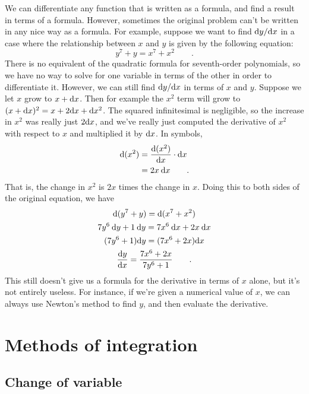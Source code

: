 We can differentiate any function that is written as a formula,
and find a result in terms of a formula. However, sometimes the
original problem can't be written in any nice way as a formula.
For example, suppose we want to find $\textup{d} y/\textup{d} x$ in a case
where the relationship between $x$
and $y$ is given by the following equation:
\begin{equation*}
  y^7+y = x^7+x^2 \qquad .
\end{equation*}
There is no equivalent of the quadratic formula for seventh-order
polynomials, so we have no way to solve for one variable in terms
of the other in order to differentiate it. However, we can still
find $\textup{d} y/\textup{d} x$ in terms of $x$ and $y$. Suppose we let $x$
grow to $x+\textup{d} x$. Then for example the $x^2$ term will grow
to $(x+\textup{d} x)^2=x+2\textup{d} x+\textup{d} x^2$. The squared infinitesimal
is negligible, so the increase in $x^2$ was really just
$2\textup{d} x$, and we've really just computed the derivative of
$x^2$ with respect to $x$ and multiplied it by $\textup{d} x$. In
symbols,
\begin{align*}
  \textup{d}(x^2) &= \frac{\textup{d}(x^2)}{\textup{d} x} \cdot \textup{d} x \\
           &= 2x \: \textup{d} x \qquad .
\end{align*}
That is, the change in $x^2$ is $2x$ times the change in $x$.
Doing this to both sides of the original equation, we have
\begin{gather*}
  \textup{d}(y^7+y) = \textup{d}(x^7+x^2)\\
  7y^6\:\textup{d} y + 1\:\textup{d} y = 7x^6\:\textup{d} x + 2x\:\textup{d} x\\
  (7y^6+1)\textup{d} y = (7x^6+2x)\textup{d} x \\
  \frac{\textup{d} y}{\textup{d} x} = \frac{7x^6+2x}{7y^6+1} \qquad .
\end{gather*}
This still doesn't give us a formula for the derivative in
terms of $x$ alone, but it's not entirely useless. For instance,
if we're given a numerical value of $x$, we can always use
Newton's method to find $y$, and then
evaluate the derivative.

\section{Methods of integration}

\subsection{Change of variable}\label{change-of-variable-for-integration}


